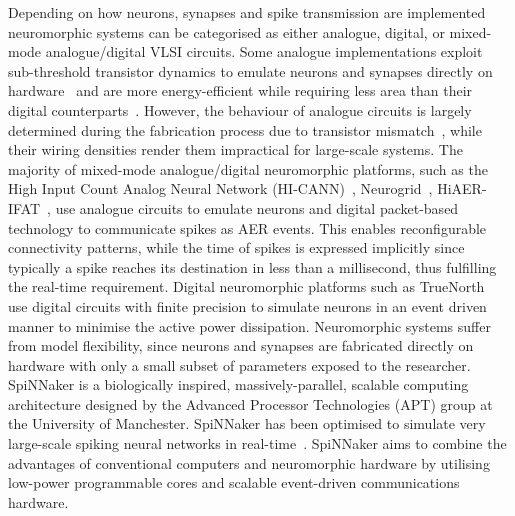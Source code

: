 \documentclass{frontiersENG} %
\begin{document}
Depending on how neurons, synapses and spike transmission are implemented neuromorphic systems can be categorised as either analogue, digital, or mixed-mode analogue/digital VLSI circuits. Some analogue implementations exploit sub-threshold transistor dynamics to emulate neurons and synapses directly on hardware~\citep{indiveri2011neuromorphic} and are more energy-efficient while requiring less area than their digital counterparts~\citep{joubert2012hardware}. However, the behaviour of analogue circuits is largely determined during the fabrication process due to transistor mismatch~\citep{indiveri2011neuromorphic,pedram2006thermal,linares2003compact}, while their wiring densities render them impractical for large-scale systems. The majority of mixed-mode analogue/digital neuromorphic platforms, such as the High Input Count Analog Neural Network (HI-CANN)~\citep{schemmel2010wafer}, Neurogrid~\citep{benjamin2014neurogrid}, HiAER-IFAT~\citep{yu201265k}, use analogue circuits to emulate neurons and digital packet-based technology to communicate spikes as AER events. This enables reconfigurable connectivity patterns, while the time of spikes is expressed implicitly since typically a spike reaches its destination in less than a millisecond, thus fulfilling the real-time requirement. Digital neuromorphic platforms such as TrueNorth~\citep{merolla2014million} use digital circuits with finite precision to simulate neurons in an event driven manner to minimise the active power dissipation. Neuromorphic systems suffer from model flexibility, since neurons and synapses are fabricated directly on hardware with only a small subset of parameters exposed to the researcher. 
SpiNNaker is a biologically inspired, massively-parallel, scalable computing architecture designed by the Advanced Processor Technologies (APT) group at the University of Manchester. SpiNNaker has been optimised to simulate very large-scale spiking neural networks in real-time~\citep{furber2014spinnaker}. SpiNNaker aims to combine the advantages of conventional computers and neuromorphic hardware by utilising low-power programmable cores and scalable event-driven communications hardware.
\end{document}
